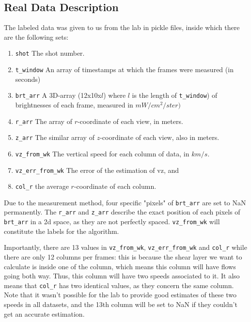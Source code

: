 \documentclass[10pt,conference]{IEEEtran}
\begin{document}
\subsection{Real Data Description}
The labeled data was given to us from the lab in pickle files, inside which there are the following sets:
\begin{enumerate}
  \item \texttt{shot} The shot number.
  \item \texttt{t\_window} An array of timestamps at which the frames were measured (in seconds)
  \item \texttt{brt\_arr} A 3D-array (12x10x$l$) where $l$ is the length of \texttt{t\_window}) of brightnesses of each frame, measured in $mW/cm^2/ster)$
  \item \texttt{r\_arr} The array of $r$-coordinate of each view, in meters.
  \item \texttt{z\_arr}  The similar array of $z$-coordinate of each view, also in meters.
  \item \texttt{vz\_from\_wk} The vertical speed for each column of data, in $km/s$.
  \item \texttt{vz\_err\_from\_wk} The error of the estimation of vz, and
  \item \texttt{col\_r} the average $r$-coordinate of each column.
\end{enumerate}
Due to the measurement method, four specific "pixels" of \texttt{brt\_arr} are set to NaN permanently. The \texttt{r\_arr} and \texttt{z\_arr} describe the exact position of each pixels of \texttt{brt\_arr} in a 2d space, as they are not perfectly spaced. \texttt{vz\_from\_wk} will constitute the labels for the algorithm.\par
Importantly, there are 13 values in \texttt{vz\_from\_wk}, \texttt{vz\_err\_from\_wk} and \texttt{col\_r} while there are only 12 columns per frames: this is because the shear layer we want to calculate is inside one of the column, which means this column will have flows going both way. Thus, this column will have two speeds associated to it. It also means that \texttt{col\_r} has two identical values, as they concern the same column.
Note that it wasn't possible for the lab to provide good estimates of these two speeds in all datasets, and the 13th column will be set to NaN if they couldn't get an accurate estimation. 
\end{document}
